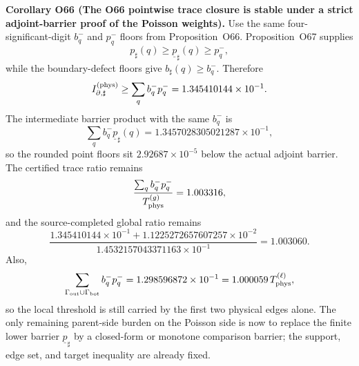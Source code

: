 \documentclass[aps,prd,onecolumn,notitlepage,nofootinbib,superscriptaddress,11pt,floatfix]{revtex4-2}
\begin{document}
\medskip\noindent\textbf{Corollary O66 (The O66 pointwise trace closure is stable under a strict adjoint-barrier proof of the Poisson weights).}
Use the same four-significant-digit \(b_q^-\) and \(p_q^-\) floors from Proposition~O66.  Proposition~O67 supplies
\[
p_\sharp(q)\ge\underline p_\sharp(q)\ge p_q^-,
\]
while the boundary-defect floors give \(b_\sharp(q)\ge b_q^-\).  Therefore
\[
I_{\partial,\sharp}^{(\rm phys)}
\ge
\sum_q b_q^-p_q^-
=1.345410144\times10^{-1}.
\]
The intermediate barrier product with the same \(b_q^-\) is
\[
\sum_q b_q^-\underline p_\sharp(q)=1.3457028305021287\times10^{-1},
\]
so the rounded point floors sit \(2.92687\times10^{-5}\) below the actual adjoint barrier.  The certified trace ratio remains
\[
\frac{\sum_q b_q^-p_q^-}{T_{\rm phys}^{(g)}}=1.003316,
\]
and the source-completed global ratio remains
\[
\frac{
1.345410144\times10^{-1}+1.1225272657607257\times10^{-2}
}{
1.4532157043371163\times10^{-1}
}
=1.003060.
\]
Also,
\[
\sum_{\Gamma_{\rm out}\cup\Gamma_{\rm bot}}b_q^-p_q^-
=1.298596872\times10^{-1}
=1.000059\,T_{\rm phys}^{(\ell)},
\]
so the local threshold is still carried by the first two physical edges alone.  The only remaining parent-side burden on the Poisson side is now to replace the finite lower barrier \(\underline p_\sharp\) by a closed-form or monotone comparison barrier; the support, edge set, and target inequality are already fixed.
\end{document}
